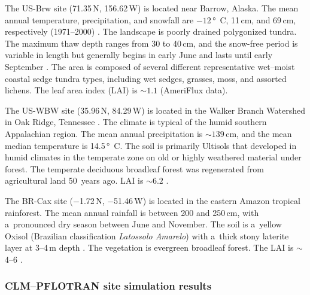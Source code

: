 \documentclass[gmd,noline]{copernicus}
\begin{document}
      The US-Brw site (71.35{\degree}\,N, 156.62{\degree}\,W) is located
      near Barrow, Alaska. The mean annual temperature, precipitation, and
      snowfall are $-12$\,\unit{\degree C}, 11\,\unit{cm}, and
      69\,\unit{cm}, respectively (1971--2000) \citep{Lara2012}. The
      landscape is poorly drained polygonized tundra. The maximum thaw depth
      ranges from 30 to 40\,\unit{cm}, and the snow-free period is variable
      in length but generally begins in early June and lasts until early
      September \citep{Hinkel2003}. The area is composed of several
      different representative wet--moist coastal sedge tundra types,
      including wet sedges, grasses, moss, and assorted lichens. The leaf
      area index (LAI) is $\sim 1.1$ (AmeriFlux data).

      The US-WBW site (35.96{\degree}\,N, 84.29{\degree}\,W) is located in
      the Walker Branch Watershed in Oak Ridge, Tennessee
      \citep{Hanson2003}. The climate is typical of the humid southern
      Appalachian region. The mean annual precipitation is $\sim
      139$\,\unit{cm}, and the mean median temperature is
      14.5\,\unit{\degree C}.  The soil is primarily Ultisols that developed
      in humid climates in the temperate zone on old or highly weathered
      material under forest. The temperate deciduous broadleaf forest was
      regenerated from agricultural land 50~years ago.  LAI is $\sim 6.2$
      \citep{Hanson2004}.

      The BR-Cax site ($-$1.72{\degree}\,N, $-$51.46{\degree}\,W) is located
      in the eastern Amazon tropical rainforest. The mean annual rainfall is
      between 200 and 250\,\unit{cm}, with a~pronounced dry season between
      June and November. The soil is a~yellow Oxisol (Brazilian
      classification \textit{Latossolo Amarelo}) with a~thick stony laterite layer at
      3--4\,m depth \citep{daCosta2010}. The vegetation is evergreen
      broadleaf forest. The LAI is $\sim$ 4--6 \citep{Powell2013}.



\subsubsection{CLM--PFLOTRAN site simulation results}%
\end{document}
